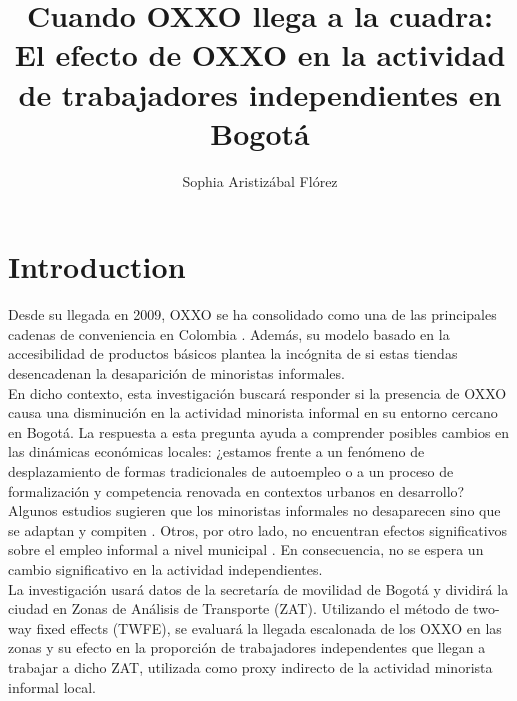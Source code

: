 \documentclass{article}
\title{Cuando OXXO llega a la cuadra: El efecto de OXXO en la actividad de trabajadores independientes en Bogotá}
\author{Sophia Aristizábal Flórez}
\date{}
\begin{document}
\maketitle

\section{Introduction}

Desde su llegada en 2009, OXXO se ha consolidado como una de las principales cadenas de conveniencia en Colombia \parencite{m_2025}. Además, su modelo basado en la accesibilidad de productos básicos plantea la incógnita de si estas tiendas desencadenan la desaparición de minoristas informales. \\

En dicho contexto, esta investigación buscará responder si la presencia de OXXO causa una disminución en la actividad minorista informal en su entorno cercano en Bogotá. La respuesta a esta pregunta ayuda a comprender posibles cambios en las dinámicas económicas locales: ¿estamos frente a un fenómeno de desplazamiento de formas tradicionales de autoempleo o a un proceso de formalización y competencia renovada en contextos urbanos en desarrollo? \\

Algunos estudios sugieren que los minoristas informales no desaparecen sino que se adaptan y compiten \parencite{marcos2022}. Otros, por otro lado, no encuentran efectos significativos sobre el empleo informal a nivel municipal \parencite{delgado2024}. En consecuencia, no se espera un cambio significativo en la actividad independientes. \\

La investigación usará datos de la secretaría de movilidad de Bogotá y dividirá la ciudad en Zonas de Análisis de Transporte (ZAT).  Utilizando el método de two-way fixed effects (TWFE), se evaluará la llegada escalonada de los OXXO en las zonas y su efecto en la proporción de trabajadores independentes que llegan a trabajar a dicho ZAT, utilizada como proxy indirecto de la actividad minorista informal local. \\
\end{document}
